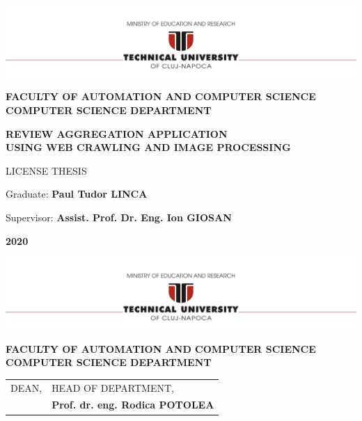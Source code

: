 \documentclass[12pt,a4paper,twoside]{report}
\renewcommand{\thesisauthor}{Paul Tudor LINCA}
\renewcommand{\thesisyear}{2020}
\renewcommand{\thesistitle}{FlickRank}
\renewcommand{\thesissupervisor}{Assist. Prof. Dr. Eng. Ion GIOSAN}
\newcommand{\department}{\bf FACULTY OF AUTOMATION AND COMPUTER SCIENCE\\
COMPUTER SCIENCE DEPARTMENT}
\newcommand{\utcnlogo}{\includegraphics[width=15cm]{img/tucn.jpg}}
\begin{document}

\newenvironment{definition}[1][Defini\c{t}ie.]{\begin{trivlist}
\item[\hskip \labelsep {\bfseries #1}]}{\end{trivlist}}





\begin{center}
\utcnlogo

\department

\vspace{4cm}

\textbf{REVIEW AGGREGATION APPLICATION\\USING WEB CRAWLING AND IMAGE PROCESSING }

\vspace{1cm}

LICENSE THESIS

\vspace{7cm}

Graduate: {\bf \thesisauthor} 

Supervisor: {\bf \thesissupervisor}

\vspace{2cm}
{\bf \thesisyear}

\end{center}

\thispagestyle{empty}
\newpage

\begin{center}
\utcnlogo

\department

\end{center}
\vspace{0.5cm}

\begin{tabular}{p{7cm}p{8cm}}
 \hspace{-1cm}DEAN, & HEAD OF DEPARTMENT,\\
 \hspace{-1cm}{\bf Prof. dr. eng. Liviu MICLEA} & {\bf Prof. dr. eng. Rodica POTOLEA}\\  
\end{tabular}
 
\vspace{2cm}
\end{document}
